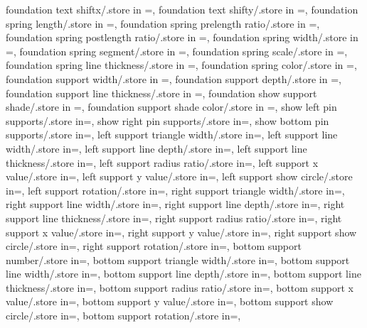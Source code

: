 {  foundation text shiftx/.store in =\foundtextshiftx,
  foundation text shifty/.store in =\foundtextshifty,
  foundation spring length/.store in =\foundspringlength,
  foundation spring prelength ratio/.store in =\foundprelenratio,
  foundation spring postlength ratio/.store in =\foundpostlenratio,
  foundation spring width/.store in =\foundampl,
  foundation spring segment/.store in =\foundsegm,
  foundation spring scale/.store in =\foundspringscale,
  foundation spring line thickness/.store in =\foundspringthk,
  foundation spring color/.store in =\foundspringcolor,
  foundation support width/.store in =\foundsuppwidth,
  foundation support depth/.store in =\foundsuppdepth,
  foundation support line thickness/.store in =\foundsupplinethk,
  foundation show support shade/.store in =\foundshowsuppshade,
  foundation support shade color/.store in =\foundsuppshadecol,
  show left pin supports/.store in=\showleftpinsup,
  show right pin supports/.store in=\showrightpinsup,
  show bottom pin supports/.store in=\showbottompinsup,
left support triangle width/.store in=\lefttriw,
left support line width/.store in=\leftlinew,
left support line depth/.store in=\leftlined,
left support line thickness/.store in=\leftlinet,
left support radius ratio/.store in=\leftradratio,
left support x value/.store in=\leftxvalue,
left support y value/.store in=\leftyvalue,
left support show circle/.store in=\leftshowcircle,
left support rotation/.store in=\leftrotpin,
right support triangle width/.store in=\righttriw,
right support line width/.store in=\rightlinew,
right support line depth/.store in=\rightlined,
right support line thickness/.store in=\rightlinet,
right support radius ratio/.store in=\rightradratio,
right support x value/.store in=\rightxvalue,
right support y value/.store in=\rightyvalue,
right support show circle/.store in=\rightshowcircle,
right support rotation/.store in=\rightrotpin,
bottom support number/.store in=\nbotpin,
bottom support triangle width/.store in=\bottomtriw,
bottom support line width/.store in=\bottomlinew,
bottom support line depth/.store in=\bottomlined,
bottom support line thickness/.store in=\bottomlinet,
bottom support radius ratio/.store in=\bottomradratio,
bottom support x value/.store in=\bottomxvalue,
bottom support y value/.store in=\bottomyvalue,
bottom support show circle/.store in=\bottomshowcircle,
bottom support rotation/.store in=\bottomrotpin,}
